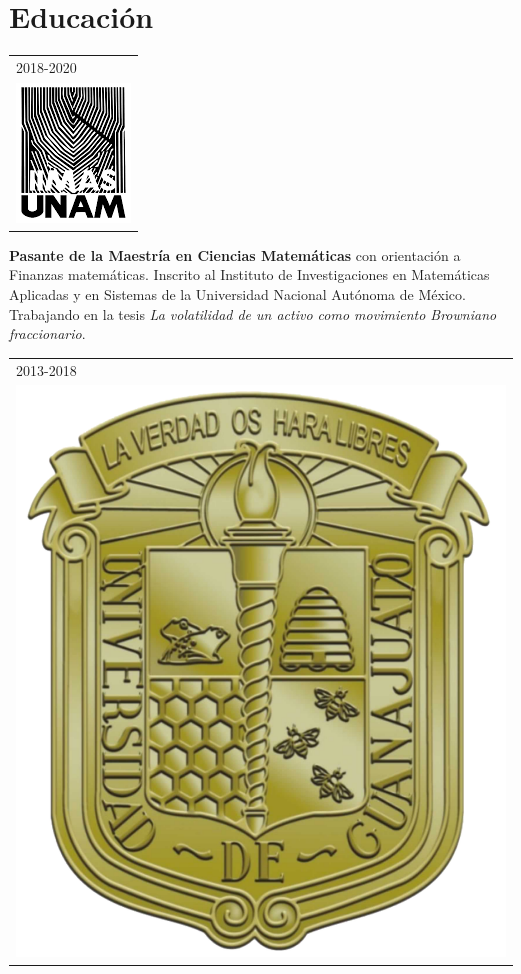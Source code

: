 \documentclass[]{friggeri-cv}
\begin{document}
\section{Educación}
\vspace{-0.3cm}
\begin{entrylist}
  \entry
     {   \begin{tabular}{l}
    		\hspace{0.8cm}2018-2020\\
     		\hspace{0.9cm}\includegraphics[scale=0.4]{img/iimas.png}
	\end{tabular}
    }
    {\vspace{-1.46cm}}
    { }
    {\textbf{Pasante de la Maestría en Ciencias Matemáticas} con orientación a Finanzas matemáticas. Inscrito al Instituto de Investigaciones en Matemáticas Aplicadas y en Sistemas de la Universidad Nacional Autónoma de México. Trabajando en la tesis \textsl{La volatilidad de un activo como movimiento Browniano fraccionario}.}
    \entry
    {   \begin{tabular}{l}
    		\hspace{0.8cm}2013-2018\\
     		\hspace{0.9cm}\includegraphics[scale=0.5]{img/UGTO.png}

\end{tabular}}
\end{entrylist}
\end{document}
